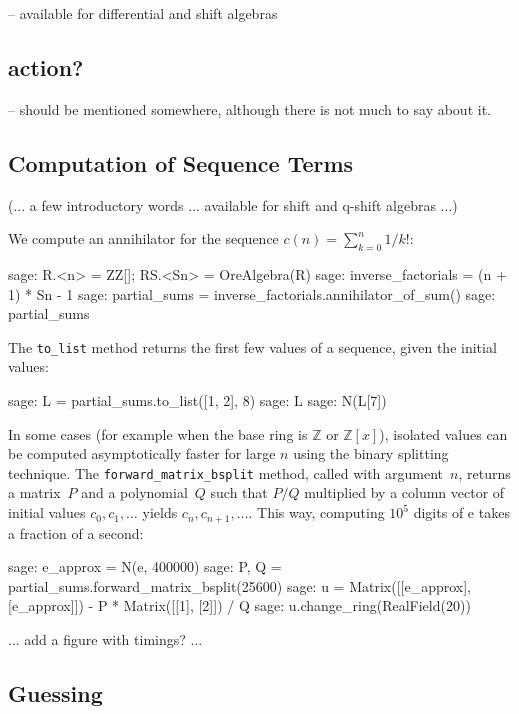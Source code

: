 \documentclass{amsart}
\begin{document}
-- available for differential and shift algebras

\subsection{action?}

-- should be mentioned somewhere, although there is not much to say about it. 

\subsection{Computation of Sequence Terms}

(... a few introductory words ... available for shift and q-shift algebras ...)

We compute an annihilator for the sequence
$c(n) = \sum_{k=0}^n 1 / k!$:

\begin{sageexample}
  sage: R.<n> = ZZ[]; RS.<Sn> = OreAlgebra(R)
  sage: inverse_factorials = (n + 1) * Sn - 1
  sage: partial_sums = inverse_factorials.annihilator_of_sum()
  sage: partial_sums
\end{sageexample}

The \verb|to_list| method returns the first few values of a sequence,
given the initial values:

\begin{sageexample}
  sage: L = partial_sums.to_list([1, 2], 8)
  sage: L
  sage: N(L[7])
\end{sageexample}

In some cases (for example when the base ring is $\mathbb{Z}$ or
$\mathbb{Z}[x]$), isolated values can be
computed asymptotically faster for large $n$ using the binary splitting
technique.
The \verb|forward_matrix_bsplit| method, called with argument~$n$,
returns a matrix~$P$ and a polynomial~$Q$ such that $P / Q$ multiplied by a
column vector of initial values $c_0, c_1, \ldots$
yields $c_n, c_{n+1}, \ldots$.
This way, computing $10^5$ digits of $\mathrm{e}$ takes a fraction of a second:

\begin{sageexample}
  sage: e_approx = N(e, 400000)
  sage: P, Q = partial_sums.forward_matrix_bsplit(25600)
  sage: u = Matrix([[e_approx], [e_approx]]) - P * Matrix([[1], [2]]) / Q
  sage: u.change_ring(RealField(20))
\end{sageexample}

... add a figure with timings? ... 

\subsection{Guessing}
\end{document}
